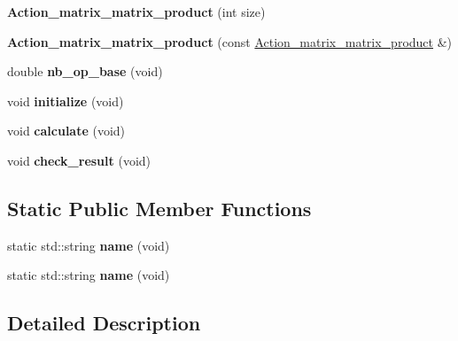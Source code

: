 \begin{DoxyCompactItemize}
{\bfseries Action\+\_\+matrix\+\_\+matrix\+\_\+product} (int size)
\item 
\mbox{\label{class_action__matrix__matrix__product_ab23b6d4d1cb67a8a8563567e668458ab}} 
{\bfseries Action\+\_\+matrix\+\_\+matrix\+\_\+product} (const \hyperlink{class_action__matrix__matrix__product}{Action\+\_\+matrix\+\_\+matrix\+\_\+product} \&)
\item 
\mbox{\label{class_action__matrix__matrix__product_a31850c978601ab51aa0fe21137729930}} 
double {\bfseries nb\+\_\+op\+\_\+base} (void)
\item 
\mbox{\label{class_action__matrix__matrix__product_a6e0e533210dded9acc7c0f8d4b095edc}} 
void {\bfseries initialize} (void)
\item 
\mbox{\label{class_action__matrix__matrix__product_a1b7c6d0e9a22ea29b2faeb0c9d83d593}} 
void {\bfseries calculate} (void)
\item 
\mbox{\label{class_action__matrix__matrix__product_a826885b0b0fb11fddbda7e8c36af31ab}} 
void {\bfseries check\+\_\+result} (void)
\end{DoxyCompactItemize}
\subsection*{Static Public Member Functions}
\begin{DoxyCompactItemize}
\item 
\mbox{\label{class_action__matrix__matrix__product_a52122dc5ecf13494b80a12512e06a1ad}} 
static std\+::string {\bfseries name} (void)
\item 
\mbox{\label{class_action__matrix__matrix__product_a52122dc5ecf13494b80a12512e06a1ad}} 
static std\+::string {\bfseries name} (void)
\end{DoxyCompactItemize}


\subsection{Detailed Description}
